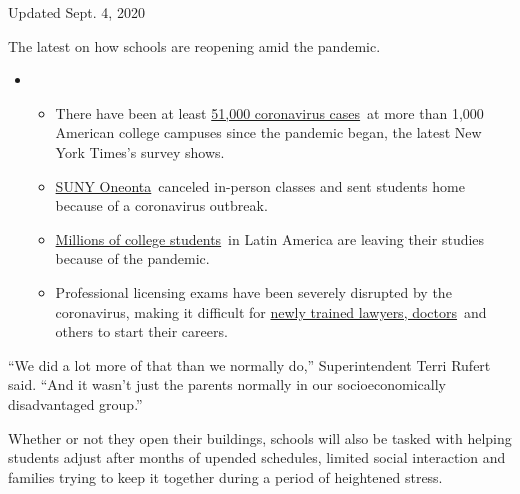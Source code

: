 Updated Sept. 4, 2020

The latest on how schools are reopening amid the pandemic.

\begin{itemize}
\item
  \begin{itemize}
  \tightlist
  \item
    There have been at least
    \href{https://www.nytimes3xbfgragh.onion/interactive/2020/us/covid-college-cases-tracker.html?name=styln-coronavirus-schools-reopening\&action=click\&pgtype=Article\&state=default\&region=MAIN_CONTENT_3\&context=storylines_keepup\&region=TOP_BANNER█=storyline_menu_recirc\&action=click\&pgtype=Article\&impression_id=149dfe80-eea3-11ea-aea8-57f827c5e458\&variant=1_Show}{51,000
    coronavirus cases}~at more than 1,000 American college campuses
    since the pandemic began, the latest New York Times's survey shows.
  \item
    \href{https://www.nytimes3xbfgragh.onion/2020/09/03/nyregion/new-york-suny-oneonta-coronavirus.html?action=click\&pgtype=Article\&state=default\&region=MAIN_CONTENT_3\&context=storylines_keepup}{SUNY
    Oneonta}~canceled in-person classes and sent students home because
    of a coronavirus outbreak.
  \item
    \href{https://www.nytimes3xbfgragh.onion/2020/09/04/world/americas/latin-america-education.html?\&action=click\&pgtype=Article\&state=default\&region=MAIN_CONTENT_3\&context=storylines_keepup}{Millions
    of college students}~in Latin America are leaving their studies
    because of the pandemic.
  \item
    Professional licensing exams have been severely disrupted by the
    coronavirus, making it difficult for
    \href{https://www.nytimes3xbfgragh.onion/2020/09/04/us/bar-exam-coronavirus.html?action=click\&pgtype=Article\&state=default\&region=MAIN_CONTENT_3\&context=storylines_keepup}{newly
    trained lawyers, doctors}~and others to start their careers.
  \end{itemize}
\end{itemize}

``We did a lot more of that than we normally do,'' Superintendent Terri
Rufert said. ``And it wasn't just the parents normally in our
socioeconomically disadvantaged group.''

Whether or not they open their buildings, schools will also be tasked
with helping students adjust after months of upended schedules, limited
social interaction and families trying to keep it together during a
period of heightened stress.

